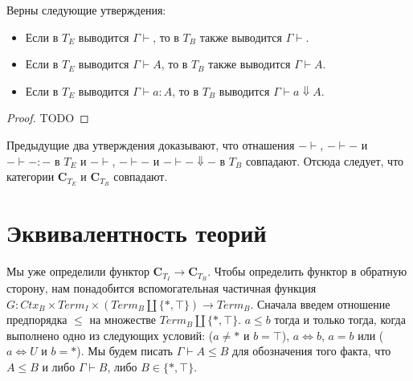 \documentclass{amsart}
\theoremstyle{definition}
\theoremstyle{remark}
\newcommand{\deq}{\Leftrightarrow}
\newcommand{\cat}[1]{\mathbf{#1}}
\renewcommand{\C}{\cat{C}}
\numberwithin{figure}{section}
\begin{document}
\begin{prop}
Верны следующие утверждения:
\begin{itemize}
\item Если в $T_E$ выводится $\Gamma \vdash$, то в $T_B$ также выводится $\Gamma \vdash$.
\item Если в $T_E$ выводится $\Gamma \vdash A$, то в $T_B$ также выводится $\Gamma \vdash A$.
\item Если в $T_E$ выводится $\Gamma \vdash a : A$, то в $T_B$ выводится $\Gamma \vdash a \Downarrow A$.
\end{itemize}
\end{prop}
\begin{proof}
TODO
\end{proof}

Предыдущие два утверждения доказывают, что отнашения $- \vdash$, $- \vdash -$ и $- \vdash - : -$ в $T_E$ и $- \vdash$, $- \vdash -$ и $- \vdash - \Downarrow -$ в $T_B$ совпадают.
Отсюда следует, что категории $\C_{T_E}$ и $\C_{T_B}$ совпадают.

\section{Эквивалентность теорий}

Мы уже определили функтор $\C_{T_I} \to \C_{T_B}$.
Чтобы определить функтор в обратную сторону, нам понадобится вспомогательная частичная функция $G : Ctx_B \times Term_I \times (Term_B \amalg \{ *, \top \}) \to Term_B$.
Сначала введем отношение предпорядка $\leq$ на множестве $Term_B \amalg \{ *, \top \}$. $a \leq b$ тогда и только тогда, когда выполнено одно из следующих условий: ($a \neq *$ и $b = \top$), $a \deq b$, $a = b$ или ($a \deq U$ и $b = *$).
Мы будем писать $\Gamma \vdash A \leq B$ для обозначения того факта, что $A \leq B$ и либо $\Gamma \vdash B$, либо $B \in \{ *, \top \}$.
\end{document}
